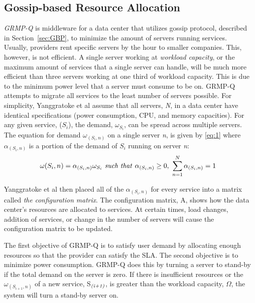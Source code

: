 \documentclass{sig-alternate}
\begin{document}
\subsection{Gossip-based Resource Allocation}
\label{sec:GBRA}


\emph{GRMP-Q} is middleware for a data center that utilizes gossip protocol, described in Section~\ref{sec:GBP}, to minimize the amount of servers running services. Usually, providers rent specific servers by the hour to smaller companies. This, however, is not efficient. A single server working at  \emph{workload capacity}, or the maximum amount of services that a single server can handle, will be much more efficient than three servers working at one third of workload capacity. This is due to the minimum power level that a server must consume to be on. GRMP-Q attempts to migrate all services to the least number of servers possible.  For simplicity, Yanggratoke et al assume that all servers, \emph{N}, in a data center have identical specifications (power consumption, CPU, and memory capacities). For any given service, ($S_i$), the demand, \emph{$\omega_{S_i}$}, can be spread across multiple servers. The equation for demand $\omega_{(S_i,n)}$ on a single server \emph{n}, is given by \eqref{eq:1} where $\alpha_{(S_{i},n)}$ is a portion of the demand of $S_{i}$ running on server \emph{n}:
\begin{equation}
\omega(S_{i},n) = \alpha_{(S_{i},n)} \omega_{S_i} \text{\emph{~such that~}} \alpha_{(S_{i},n)} \geq 0,~ \sum_{n=1}^{N} \alpha_{(S_{i},n)} = 1 \label{eq:1}
\end{equation}

Yanggratoke et al then placed all of the \emph{$\alpha_{(S_{i},n)}$} for every service into a matrix called \emph{the configuration matrix}. The configuration matrix, A, shows how the data center's resources are allocated to services. At certain times, load changes, addition of services, or change in the number of servers will cause the configuration matrix to be updated. 

The first objective of GRMP-Q is to satisfy user demand by allocating enough resources so that the provider can satisfy the SLA. The second objective is to minimize power consumption. GRMP-Q does this by turning a server to stand-by if the total demand on the server is zero. If there is insufficient resources or the \emph{$\omega_{(S_{i+1},n)}$} of a new service, S$_{\text{\emph{(i+1)}}}$, is greater than the workload capacity, $\Omega$, the system will turn a stand-by server on. 
\end{document}
